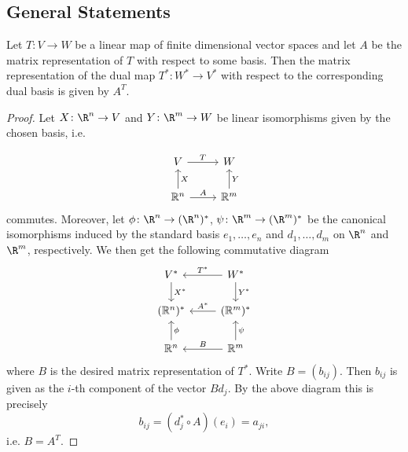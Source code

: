 \subsection{General Statements}

\begin{lemma}
    Let $T \colon V \to W$ be a linear map of finite dimensional vector spaces and let $A$ be the matrix representation of $T$ with respect to some basis. Then the matrix representation of the dual map $T^\ast \colon W^\ast \to V^\ast$ with respect to the corresponding dual basis is given by $A^T$.
\end{lemma}

\begin{proof}
    Let $X \colon \R^n \to V$ and $Y \colon \R^m \to W$ be linear isomorphisms given by the chosen basis, i.e.

    \[\begin{tikzcd}
	V & W \\
	{\mathbb{R}^n} & {\mathbb{R}^m}
	\arrow["T", from=1-1, to=1-2]
	\arrow["X"', from=2-1, to=1-1]
	\arrow["A", from=2-1, to=2-2]
	\arrow["Y"', from=2-2, to=1-2]
    \end{tikzcd}\]
    commutes. Moreover, let $\phi \colon \R^n \to (\R^n)^\ast$, $\psi \colon \R^m \to (\R^m)^\ast$ be the canonical isomorphisms induced by the standard basis $e_1,\ldots,e_n$ and $d_1,\ldots,d_m$ on $\R^n$ and $\R^m$, respectively. We then get the following commutative diagram
    \[\begin{tikzcd}
	{V^\ast} & {W^\ast} \\
	{(\mathbb{R}^n)^\ast} & {(\mathbb{R}^m)^\ast} \\
	{\mathbb{R}^n} & {\mathbb{R}^m}
	\arrow["{X^\ast}", from=1-1, to=2-1]
	\arrow["{T^\ast}"', from=1-2, to=1-1]
	\arrow["{Y^\ast}", from=1-2, to=2-2]
	\arrow["{A^\ast}"', from=2-2, to=2-1]
	\arrow["\phi"', from=3-1, to=2-1]
	\arrow["\psi"', from=3-2, to=2-2]
	\arrow["B"', from=3-2, to=3-1]
    \end{tikzcd}\]
    where $B$ is the desired matrix representation of $T^\ast$. Write $B = (b_{ij})$. Then $b_{ij}$ is given as the $i$-th component of the vector $Bd_j$. By the above diagram this is precisely
    \[
    b_{ij} = (d_j^\ast \circ A)(e_i) = a_{ji},
    \]
    i.e. $B = A^T$.
\end{proof}